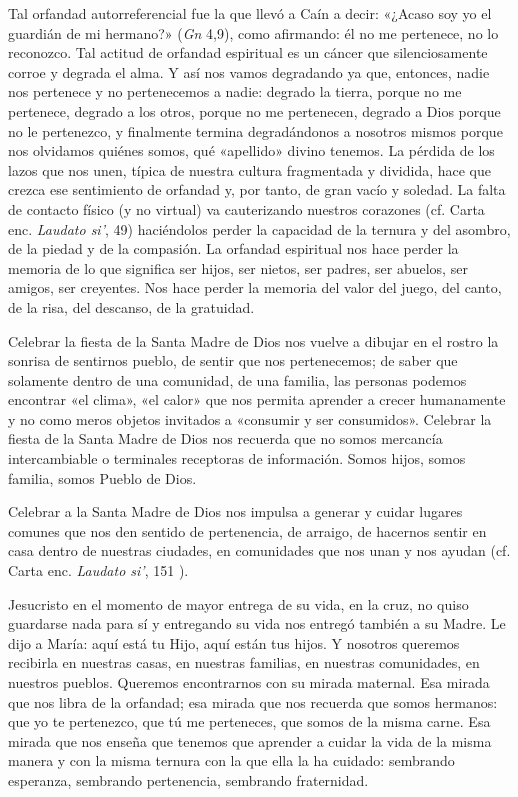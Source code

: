\documentclass[]{article}
\begin{document}
Tal orfandad autorreferencial fue la que llevó a Caín a decir: «¿Acaso
soy yo el guardián de mi hermano?» (\emph{Gn} 4,9), como afirmando: él
no me pertenece, no lo reconozco. Tal actitud de orfandad espiritual es
un cáncer que silenciosamente corroe y degrada el alma. Y así nos vamos
degradando ya que, entonces, nadie nos pertenece y no pertenecemos a
nadie: degrado la tierra, porque no me pertenece, degrado a los otros,
porque no me pertenecen, degrado a Dios porque no le pertenezco, y
finalmente termina degradándonos a nosotros mismos porque nos olvidamos
quiénes somos, qué «apellido» divino tenemos. La pérdida de los lazos
que nos unen, típica de nuestra cultura fragmentada y dividida, hace que
crezca ese sentimiento de orfandad y, por tanto, de gran vacío y
soledad. La falta de contacto físico (y no virtual) va cauterizando
nuestros corazones (cf. Carta enc. \emph{Laudato si'}, 49) haciéndolos
perder la capacidad de la ternura y del asombro, de la piedad y de la
compasión. La orfandad espiritual nos hace perder la memoria de lo que
significa ser hijos, ser nietos, ser padres, ser abuelos, ser amigos,
ser creyentes. Nos hace perder la memoria del valor del juego, del
canto, de la risa, del descanso, de la gratuidad.

Celebrar la fiesta de la Santa Madre de Dios nos vuelve a dibujar en el
rostro la sonrisa de sentirnos pueblo, de sentir que nos pertenecemos;
de saber que solamente dentro de una comunidad, de una familia, las
personas podemos encontrar «el clima», «el calor» que nos permita
aprender a crecer humanamente y no como meros objetos invitados a
«consumir y ser consumidos». Celebrar la fiesta de la Santa Madre de
Dios nos recuerda que no somos mercancía intercambiable o terminales
receptoras de información. Somos hijos, somos familia, somos Pueblo de
Dios.

Celebrar a la Santa Madre de Dios nos impulsa a generar y cuidar lugares
comunes que nos den sentido de pertenencia, de arraigo, de hacernos
sentir en casa dentro de nuestras ciudades, en comunidades que nos unan
y nos ayudan (cf. Carta enc. \emph{Laudato si'}, 151 ).

Jesucristo en el momento de mayor entrega de su vida, en la cruz, no
quiso guardarse nada para sí y entregando su vida nos entregó también a
su Madre. Le dijo a María: aquí está tu Hijo, aquí están tus hijos. Y
nosotros queremos recibirla en nuestras casas, en nuestras familias, en
nuestras comunidades, en nuestros pueblos. Queremos encontrarnos con su
mirada maternal. Esa mirada que nos libra de la orfandad; esa mirada que
nos recuerda que somos hermanos: que yo te pertenezco, que tú me
perteneces, que somos de la misma carne. Esa mirada que nos enseña que
tenemos que aprender a cuidar la vida de la misma manera y con la misma
ternura con la que ella la ha cuidado: sembrando esperanza, sembrando
pertenencia, sembrando fraternidad.
\end{document}
